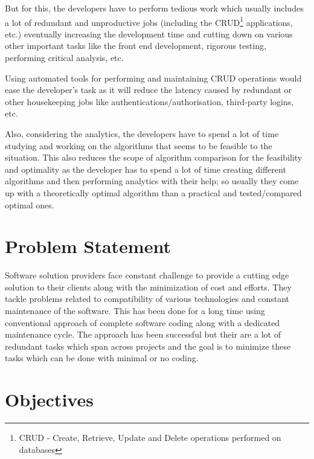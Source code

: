 \documentclass[a4paper,12pt]{report}
\begin{document}
    But for this, the developers have to perform tedious work which usually includes a lot of redundant and unproductive jobs (including the CRUD\footnote{ CRUD - Create, Retrieve, Update and Delete operations performed on databases } applications, etc.)  eventually increasing the development time and cutting down on various other important tasks like the front end development, rigorous testing, performing critical analysis, etc. 
    
    Using automated tools for performing and maintaining CRUD operations would ease the developer's task as it will reduce the latency caused by redundant or other housekeeping jobs like authentications/authorisation, third-party logins, etc.
    
    Also, considering the analytics, the developers have to spend a lot of time studying and working on the algorithms that seems to be feasible to the situation. This also reduces the scope of algorithm comparison for the feasibility and optimality as the developer has to spend a lot of time creating different algorithms and then performing analytics with their help; so usually they come up with a theoretically optimal algorithm than a practical and tested/compared optimal ones.
    \section{Problem Statement}
    Software solution providers face constant challenge to provide a cutting edge solution to their clients along with the minimization of cost and efforts. They tackle problems related to compatibility of various technologies and constant maintenance of the software. This has been done for a long time using conventional approach of complete software coding along with a dedicated maintenance cycle. The approach has been successful but their are a lot of redundant tasks which span across projects and the goal is to minimize these tasks which can be done with minimal or no coding.    
    \section{Objectives}
\end{document}
